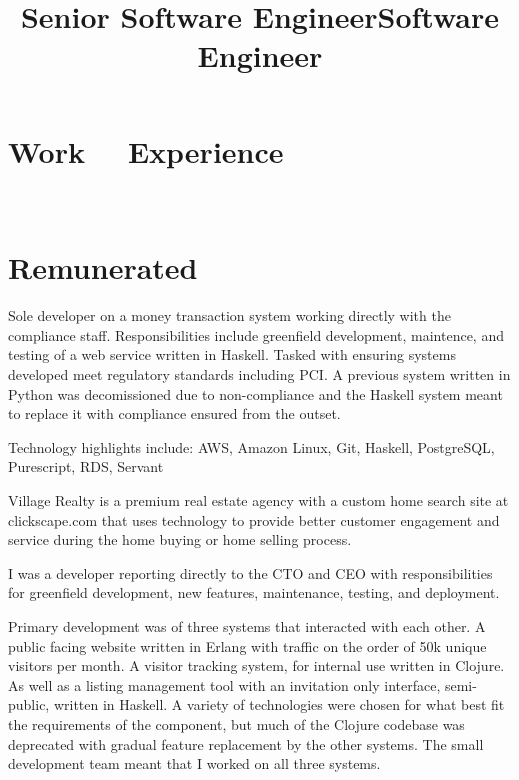 \documentclass[margintitle,line]{res}
\renewcommand{\subsection}[1]{\section{\normalfont #1}}
\begin{document}
\begin{resume}
\section{Work \ \ Experience}
\ \\
\subsection{Remunerated}

\title{Senior Software Engineer}
\begin{position}
  Sole developer on a money transaction system working directly with the
  compliance staff. Responsibilities include greenfield
  development, maintence, and testing of a web service written in Haskell. Tasked
  with ensuring systems developed meet regulatory standards including PCI. A
  previous system written in Python was decomissioned due to non-compliance and
  the Haskell system meant to replace it with compliance ensured from the outset.

  Technology highlights include: AWS, Amazon Linux, Git, Haskell, PostgreSQL,
  Purescript, RDS, Servant
\end{position}

\title{Software Engineer}
\begin{position}
  Village Realty is a premium real estate agency with a custom home search site
  at clickscape.com that uses technology to provide better customer engagement
  and service during the home buying or home selling process.

  I was a developer reporting directly to the CTO and CEO with responsibilities
  for greenfield development, new features, maintenance, testing, and deployment.

  Primary development was of three systems that interacted with each other.
  A public facing website  written in Erlang with traffic on the order of 50k
  unique visitors per month. A visitor tracking system, for internal use written
  in Clojure. As well as a listing management tool with an invitation only
  interface, semi-public, written in Haskell. A variety of technologies were
  chosen for what best fit the requirements of the component, but much of the
  Clojure codebase was deprecated with gradual feature replacement by the other
  systems. The small development team meant that I worked on all three systems.


\end{position}
\end{resume}
\end{document}
